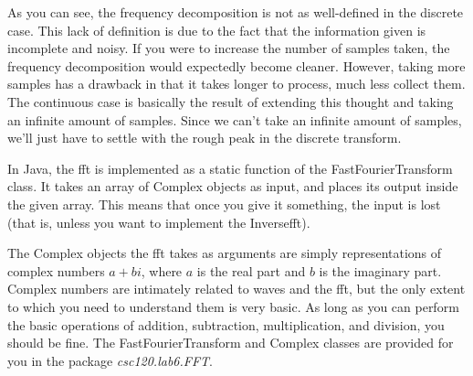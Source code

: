As you can see, the frequency decomposition is not as well-defined in the discrete case.
This lack of definition is due to the fact that the information given is incomplete and noisy.
If you were to increase the number of samples taken, the frequency decomposition would expectedly become cleaner.
However, taking more samples has a drawback in that it takes longer to process, much less collect them.
The continuous case is basically the result of extending this thought and taking an infinite amount of samples.
Since we can't take an infinite amount of samples, we'll just have to settle with the rough peak in the discrete transform.

In Java, the \ac{fft} is implemented as a static function of the FastFourierTransform class.
It takes an array of Complex objects as input, and places its output inside the given array.
This means that once you give it something, the input is lost (that is, unless you want to implement the Inverse\ac{fft}).

The Complex objects the \ac{fft} takes as arguments are simply representations of complex numbers $a+bi$, where $a$ is the real part and $b$ is the imaginary part.
Complex numbers are intimately related to waves and the \ac{fft}, but the only extent to which you need to understand them is very basic.
As long as you can perform the basic operations of addition, subtraction, multiplication, and division, you should be fine.
The FastFourierTransform and Complex classes are provided for you in the package {\em csc120.lab6.FFT}.